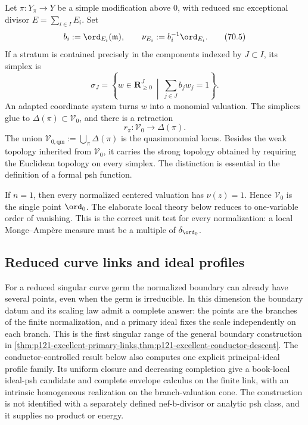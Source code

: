 Let $\pi:Y_\pi\to Y$ be a simple modification above $0$, with reduced
snc exceptional divisor $E=\sum_{i\in I}E_i$.  Set
\[
                         b_i:=\ord_{E_i}(\mathfrak m),
 \qquad
                         \nu_{E_i}:=b_i^{-1}\ord_{E_i}.
\tag{70.5}\label{eq:local-divisorial-normalization}
\]
If a stratum is contained precisely in the components indexed by
$J\subset I$, its simplex is
\[
 \sigma_J
 =\left\{w\in\mathbf R_{\geq0}^J\ \middle|\
                    \sum_{j\in J}b_jw_j=1\right\}.
\tag{70.6}\label{eq:local-weight-simplex}
\]
An adapted coordinate system turns $w$ into a monomial valuation.  The
simplices glue to $\Delta(\pi)\subset\mathcal V_0$, and there is a
retraction
\[
                         r_\pi:\mathcal V_0\longrightarrow\Delta(\pi).
\tag{70.7}\label{eq:local-retraction}
\]
The union $\mathcal V_{0,\mathrm{qm}}:=\bigcup_\pi\Delta(\pi)$ is the
quasimonomial locus.  Besides the weak topology inherited from
$\mathcal V_0$, it carries the strong topology obtained by requiring the
Euclidean topology on every simplex.  The distinction is essential in the
definition of a formal psh function.

\begin{example}
\label{ex:local-smooth-curve-link}
If $n=1$, then every normalized centered valuation has
$\nu(z)=1$.  Hence $\mathcal V_0$ is the single point
$\ord_0$.  The elaborate local theory below reduces to one-variable order
of vanishing.  This is the correct unit test for every normalization: a
local Monge--Amp\`ere measure must be a multiple of
$\delta_{\ord_0}$.
\end{example}



\subsection{Reduced curve links and ideal profiles}
\label{subsec:local-reduced-curve-profiles}

For a reduced singular curve germ the normalized boundary can already have
several points, even when the germ is irreducible.  In this dimension the
boundary datum and its scaling law admit a complete answer: the points are
the branches of the finite normalization, and a primary ideal fixes the
scale independently on each branch.  This is the first singular range of
the general boundary construction in
\cref{thm:p121-excellent-primary-links,thm:p121-excellent-conductor-descent}.
The
conductor-controlled result below also computes one explicit principal-ideal
profile family.  Its uniform closure and decreasing completion give a
book-local ideal-psh candidate and complete envelope calculus on the finite
link, with an intrinsic homogeneous realization on the branch-valuation
cone.  The construction is not identified with a separately defined
nef-b-divisor or analytic psh class, and it supplies no product or energy.

